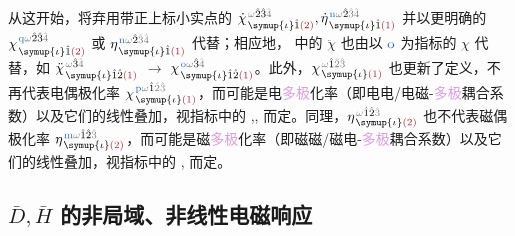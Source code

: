 从这开始，将弃用带正上标小实点的 $\dot{\chi}^{\;\! \mathcolor{gray}{\omega} \hat{2} \hat{3} \mathcolor{gray}{\hat{4}}}_{\;\! \symup{\iota} \hat{1} \textcolor{Maroon}{(2)}}, \dot{\eta}^{\;\! \textcolor{NavyBlue}{\text{n}} \mathcolor{gray}{\omega} \hat{2} \mathcolor{gray}{\hat{3} \hat{4}}}_{\;\! \symup{\iota} \hat{1} \textcolor{Maroon}{(1)}}$ 并以更明确的 $\chi^{\;\! \textcolor{NavyBlue}{\text{q}} \mathcolor{gray}{\omega} \hat{2} \hat{3} \mathcolor{gray}{\hat{4}}}_{\;\! \symup{\iota} \hat{1} \textcolor{Maroon}{(2)}}$ 或 $\eta^{\;\! \textcolor{NavyBlue}{\text{n}} \mathcolor{gray}{\omega} \hat{2} \mathcolor{gray}{\hat{3} \hat{4}}}_{\;\! \symup{\iota} \hat{1} \textcolor{Maroon}{(1)}}$ 代替；相应地， 中的 $\ddot{\chi}$ 也由以 $\textcolor{NavyBlue}{\text{o}}$ 为指标的 $\chi$ 代替，如 $\ddot{\chi}^{\;\! \mathcolor{gray}{\omega} \hat{3} \mathcolor{gray}{\hat{4}}}_{\;\! \symup{\iota} \hat{1} \hat{2} \textcolor{Maroon}{(1)}}$ $\longrightarrow$ $\chi^{\;\! \textcolor{NavyBlue}{\text{o}} \mathcolor{gray}{\omega} \hat{3} \mathcolor{gray}{\hat{4}}}_{\;\! \symup{\iota} \hat{1} \hat{2} \textcolor{Maroon}{(1)}}$。此外，$\chi^{\;\! \mathcolor{gray}{\omega} \hat{1} \mathcolor{gray}{\hat{2} \hat{3}}}_{\;\! \symup{\iota} \textcolor{Maroon}{(1)}}$ 也更新了定义，不再代表电偶极化率 $\chi^{\;\! \textcolor{NavyBlue}{\text{p}} \mathcolor{gray}{\omega} \hat{1} \mathcolor{gray}{\hat{2} \hat{3}}}_{\;\! \symup{\iota} \textcolor{Maroon}{(1)}}$，而可能是电\textcolor{Plum}{多极}化率（即电电/电磁-\textcolor{Plum}{多极}耦合系数）以及它们的\textcolor{PineGreen}{线性叠加}，视指标中的 \textcolor{NavyBlue}{},\textcolor{NavyBlue}{},\textcolor{NavyBlue}{} 而定。同理，$\eta^{\;\! \mathcolor{gray}{\omega} \hat{1} \hat{2} \mathcolor{gray}{\hat{3}}}_{\;\! \symup{\iota} \textcolor{Maroon}{(2)}}$ 也不代表磁偶极化率 $\eta^{\;\! \textcolor{NavyBlue}{\text{m}} \mathcolor{gray}{\omega} \hat{1} \hat{2} \mathcolor{gray}{\hat{3}}}_{\;\! \symup{\iota} \textcolor{Maroon}{(2)}}$，而可能是磁\textcolor{Plum}{多极}化率（即磁磁/磁电-\textcolor{Plum}{多极}耦合系数）以及它们的\textcolor{PineGreen}{线性叠加}，视指标中的 \textcolor{NavyBlue}{},\textcolor{NavyBlue}{} 而定。

\vspace*{-3.0em}

\subsection{$\bar{D},\bar{H}$ 的非局域、非线性电磁响应}\label{ssec:DH-nonlinear}

